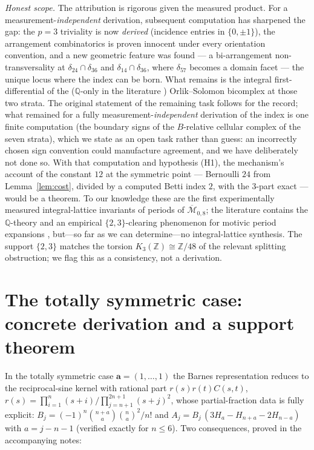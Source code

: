 \documentclass[11pt]{article}
\theoremstyle{definition}
\newcommand{\Z}{\mathbb{Z}}
\newcommand{\Q}{\mathbb{Q}}
\begin{document}
\emph{Honest scope.} The attribution is rigorous given the measured
product. For a measurement-\emph{independent} derivation, subsequent
computation has sharpened the gap: the $p=3$ triviality is now
\emph{derived} (incidence entries in $\{0,\pm1\}$), the arrangement
combinatorics is proven innocent under every orientation convention,
and a new geometric feature was found --- a bi-arrangement
non-transversality at $\delta_{24}\cap\delta_{36}$ and
$\delta_{14}\cap\delta_{36}$, where $\delta_{57}$ becomes a domain
facet --- the unique locus where the index can be born. What remains is
the integral first-differential of the ($\Q$-only in the literature
\cite{DupontBi}) Orlik--Solomon bicomplex at those two strata. The
original statement of the remaining task follows for the record; what
remained for a fully measurement-\emph{independent}
derivation of the index is one finite computation (the boundary signs
of the $B$-relative cellular complex of the seven strata), which we
state as an open task rather than guess: an incorrectly chosen sign
convention could manufacture agreement, and we have deliberately not
done so. With that computation and hypothesis (H1), the mechanism's
account of the constant $12$ at the symmetric point --- Bernoulli $24$
from Lemma~\ref{lem:cost}, divided by a computed Betti index $2$, with
the $3$-part exact --- would be a theorem. To our knowledge
these are the first experimentally measured integral-lattice invariants
of periods of $\overline{\mathcal M}_{0,8}$; the literature contains the
$\Q$-theory \cite{DG,BrownMTZ,BrownM08} and an empirical
$\{2,3\}$-clearing phenomenon for motivic period expansions
\cite{Schnetz}, but---so far as we can determine---no integral-lattice
synthesis. The support $\{2,3\}$ matches the torsion
$K_3(\Z)\cong\Z/48$ \cite{LS} of the relevant splitting obstruction; we
flag this as a consistency, not a derivation.

\section{The totally symmetric case: concrete derivation and a support
theorem}\label{sec:symmetric}

In the totally symmetric case $\mathbf a=(1,\dots,1)$ the Barnes
representation reduces to the reciprocal-sine kernel with rational part
$r(s)r(t)C(s,t)$, $r(s)=\prod_{i=1}^n(s+i)\big/\prod_{j=n+1}^{2n+1}(s+j)^2$,
whose partial-fraction data is fully explicit:
$B_j=(-1)^n\binom{n+a}{a}\binom{n}{a}^2/n!$ and
$A_j=B_j\,(3H_a-H_{n+a}-2H_{n-a})$ with $a=j-n-1$ (verified exactly for
$n\le6$). Two consequences, proved in the accompanying notes:
\end{document}
